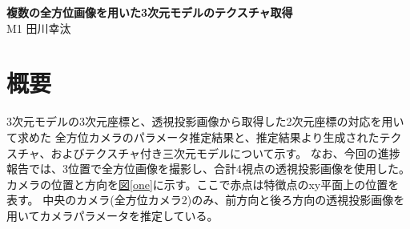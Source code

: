 \documentclass[]{jarticle}          %
\begin{document}

\vspace*{2ex}
\begin{center}
 {\Large \bf 複数の全方位画像を用いた3次元モデルのテクスチャ取得}\\ %
 \vspace*{5mm}
 {\large M1 田川幸汰}%
\end{center}





\section{概要}
3次元モデルの3次元座標と、透視投影画像から取得した2次元座標の対応を用いて求めた
全方位カメラのパラメータ推定結果と、推定結果より生成されたテクスチャ、およびテクスチャ付き三次元モデルについて示す。
なお、今回の進捗報告では、3位置で全方位画像を撮影し、合計4視点の透視投影画像を使用した。
カメラの位置と方向を\hyperref[one]{図\ref{one}}に示す。ここで赤点は特徴点のxy平面上の位置を表す。
中央のカメラ(全方位カメラ2)のみ、前方向と後ろ方向の透視投影画像を用いてカメラパラメータを推定している。
\end{document}
